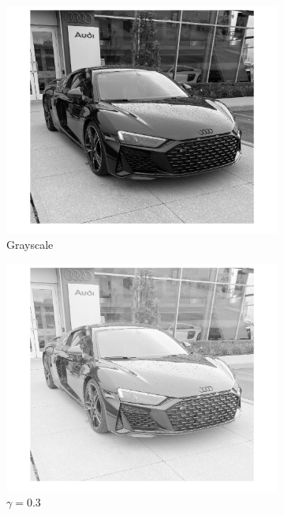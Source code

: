 \documentclass[conference]{IEEEtran}
\begin{document}
\begin{figure}[h!]
\centering
\begin{subfigure}[b]{0.3\linewidth}
\includegraphics[width=\linewidth]{images/img1.jpg}
\caption{Grayscale}
\end{subfigure}
\begin{subfigure}[b]{0.3\linewidth}
\includegraphics[width=\linewidth]{images/img2.jpg}
\caption{\(\gamma = 0.3\)}
\end{subfigure}
\begin{subfigure}[b]{0.3\linewidth}

\end{subfigure}
\end{figure}
\end{document}
